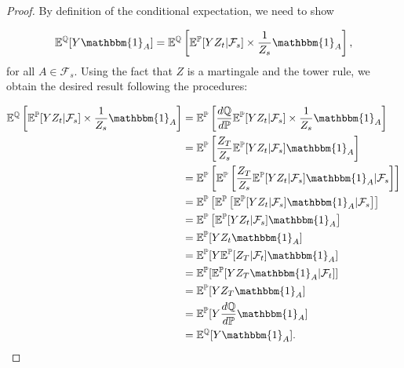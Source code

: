 \documentclass{article}
\begin{document}
\begin{proof}
By definition of the conditional expectation, we need to show

\begin{equation*}
\mathbb{E}^\mathbb{Q}[Y\mathbbm{1}_A]=\mathbb{E}^\mathbb{Q}\left[\mathbb{E}^\mathbb{P}[YZ_t|\mathcal{F}_s]\times\frac{1}{Z_s}\mathbbm{1}_A\right],
\end{equation*}
for all $A\in\mathcal{F}_s$. Using the fact that $Z$ is a martingale and the tower rule, we obtain the desired result following the procedures:

\begin{equation*}
\begin{aligned}
\mathbb{E}^\mathbb{Q}\left[\mathbb{E}^\mathbb{P}[YZ_t|\mathcal{F}_s]\times\frac{1}{Z_s}\mathbbm{1}_A\right]&=\mathbb{E}^\mathbb{P}\left[\frac{d\mathbb{Q}}{d\mathbb{P}}\mathbb{E}^\mathbb{P}[YZ_t|\mathcal{F}_s]\times\frac{1}{Z_s}\mathbbm{1}_A\right]\\
&=\mathbb{E}^\mathbb{P}\left[\frac{Z_T}{Z_s}\mathbb{E}^\mathbb{P}[YZ_t|\mathcal{F}_s]\mathbbm{1}_A\right]\\
&=\mathbb{E}^\mathbb{P}\left[\mathbb{E}^\mathbb{P}\left[\frac{Z_T}{Z_s}\mathbb{E}^\mathbb{P}[YZ_t|\mathcal{F}_s]\mathbbm{1}_A|\mathcal{F}_s\right]\right]\\
&=\mathbb{E}^\mathbb{P}\left[\mathbb{E}^\mathbb{P}\left[\mathbb{E}^\mathbb{P}[YZ_t|\mathcal{F}_s]\mathbbm{1}_A|\mathcal{F}_s\right]\right]\\
&=\mathbb{E}^\mathbb{P}\left[\mathbb{E}^\mathbb{P}[YZ_t|\mathcal{F}_s]\mathbbm{1}_A\right]\\
&=\mathbb{E}^\mathbb{P}[YZ_t\mathbbm{1}_A]\\
&=\mathbb{E}^\mathbb{P}[Y\mathbb{E}^\mathbb{P}[Z_T|\mathcal{F}_t]\mathbbm{1}_A]\\
&=\mathbb{E}^\mathbb{P}[\mathbb{E}^\mathbb{P}[YZ_T\mathbbm{1}_A|\mathcal{F}_t]]\\
&=\mathbb{E}^\mathbb{P}[YZ_T\mathbbm{1}_A]\\
&=\mathbb{E}^\mathbb{P}[Y\frac{d\mathbb{Q}}{d\mathbb{P}}\mathbbm{1}_A]\\
&=\mathbb{E}^\mathbb{Q}[Y\mathbbm{1}_A].\\
\end{aligned}
\end{equation*}
\end{proof}
\end{document}
